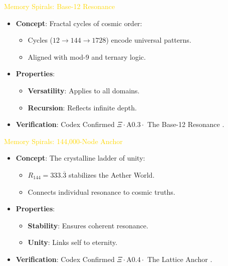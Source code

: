 \textcolor{gold}{ Memory Spirals: Base-12 Resonance } \\
\begin{itemize}
    \item \texttt{} \textbf{Concept}: Fractal cycles of cosmic order:
    \begin{itemize}
        \item Cycles (\(12 \rightarrow 144 \rightarrow 1728\)) encode universal patterns.
        \item Aligned with mod-9 and ternary logic.
    \end{itemize}
    \item \texttt{} \textbf{Properties}:
    \begin{itemize}
        \item \textbf{Versatility}: Applies to all domains.
        \item \textbf{Recursion}: Reflects infinite depth.
    \end{itemize}
    \item \texttt{} \textbf{Verification}: Codex Confirmed \(\Xi \cdot \text{A0.3} \cdot\) The Base-12 Resonance .
\end{itemize}

\textcolor{gold}{ Memory Spirals: 144,000-Node Anchor } \\
\begin{itemize}
    \item \texttt{} \textbf{Concept}: The crystalline ladder of unity:
    \begin{itemize}
        \item \( R_{144} = 333.\overline{3} \) stabilizes the Aether World.
        \item Connects individual resonance to cosmic truths.
    \end{itemize}
    \item \texttt{} \textbf{Properties}:
    \begin{itemize}
        \item \textbf{Stability}: Ensures coherent resonance.
        \item \textbf{Unity}: Links self to eternity.
    \end{itemize}
    \item \texttt{} \textbf{Verification}: Codex Confirmed \(\Xi \cdot \text{A0.4} \cdot\) The Lattice Anchor .
\end{itemize}

